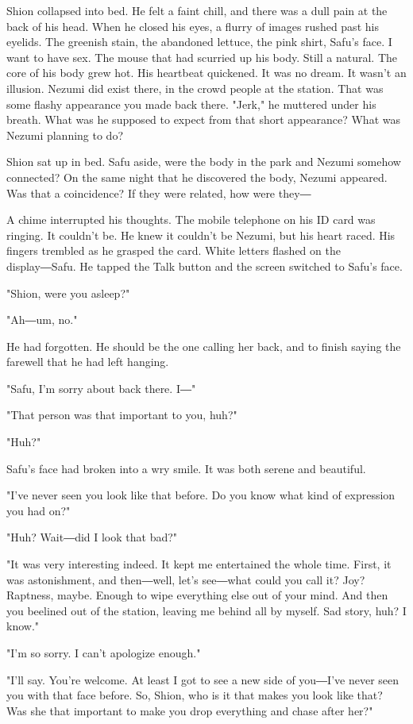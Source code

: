 Shion collapsed into bed. He felt a faint chill, and there was a dull
pain at the back of his head. When he closed his eyes, a flurry of
images rushed past his eyelids. The greenish stain, the abandoned
lettuce, the pink shirt, Safu's face. I want to have sex. The mouse that
had scurried up his body. Still a natural. The core of his body grew
hot. His heartbeat quickened. It was no dream. It wasn't an illusion.
Nezumi did exist there, in the crowd people at the station. That was
some flashy appearance you made back there. "Jerk," he muttered under
his breath. What was he supposed to expect from that short appearance?
What was Nezumi planning to do?

Shion sat up in bed. Safu aside, were the body in the park and Nezumi
somehow connected? On the same night that he discovered the body, Nezumi
appeared. Was that a coincidence? If they were related, how were they―

A chime interrupted his thoughts. The mobile telephone on his ID card
was ringing. It couldn't be. He knew it couldn't be Nezumi, but his
heart raced. His fingers trembled as he grasped the card. White letters
flashed on the display―Safu. He tapped the Talk button and the screen
switched to Safu's face.

"Shion, were you asleep?"

"Ah―um, no."

He had forgotten. He should be the one calling her back, and to finish
saying the farewell that he had left hanging.

"Safu, I'm sorry about back there. I―"

"That person was that important to you, huh?"

"Huh?"

Safu's face had broken into a wry smile. It was both serene and
beautiful.

"I've never seen you look like that before. Do you know what kind of
expression you had on?"

"Huh? Wait―did I look that bad?"

"It was very interesting indeed. It kept me entertained the whole time.
First, it was astonishment, and then―well, let's see―what could you call
it? Joy? Raptness, maybe. Enough to wipe everything else out of your
mind. And then you beelined out of the station, leaving me behind all by
myself. Sad story, huh? I know."

"I'm so sorry. I can't apologize enough."

"I'll say. You're welcome. At least I got to see a new side of you―I've
never seen you with that face before. So, Shion, who is it that makes
you look like that? Was she that important to make you drop everything
and chase after her?"

